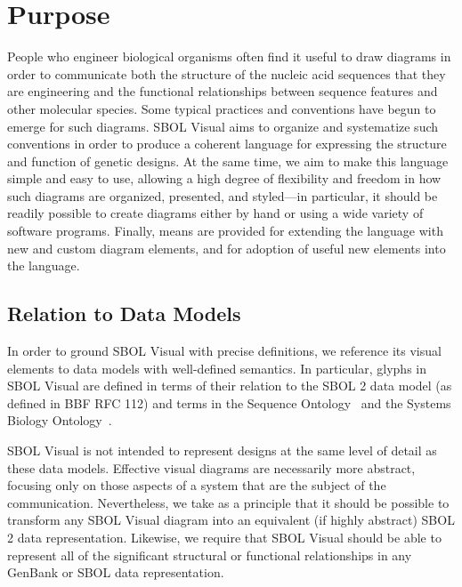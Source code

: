 \section{Purpose}

People who engineer biological organisms often find it useful to draw diagrams in order to
communicate both the structure of the nucleic acid sequences that they are engineering
and the functional relationships between sequence features and other molecular species.
%
Some typical practices and conventions have begun to emerge for such
diagrams.  SBOL Visual aims to organize and systematize such
conventions in order to produce a coherent language for expressing
the structure and function 
of genetic designs. 
%
At the same time, we aim to make this language simple and easy to use,
allowing a high degree of flexibility and freedom in how such diagrams are organized, presented, and
styled---in particular, it should be readily possible to create
diagrams either by hand or using a wide variety of software programs.
%
Finally, means are provided for extending the language with new and
custom diagram elements, and for adoption of useful new elements into
the language.

\subsection{Relation to Data Models}


In order to ground SBOL Visual with precise definitions, we reference its visual elements to data models with well-defined semantics.
In particular, glyphs in SBOL Visual are defined in terms of their relation to the SBOL 2 data model (as defined in BBF RFC 112) and terms in the Sequence Ontology~\citep{SequenceOntology} and
the Systems Biology Ontology~\citep{SBO}.

SBOL Visual is not intended to represent designs at the same level of detail as these data models.
Effective visual diagrams are necessarily more abstract, focusing only on those aspects of a system that are the subject of the communication.
Nevertheless, we take as a principle that it should be possible to transform any SBOL Visual diagram into an equivalent (if highly abstract) SBOL 2 data representation.
Likewise, we require that SBOL Visual should be able to represent all of the significant structural or functional relationships in any GenBank or SBOL data representation.
